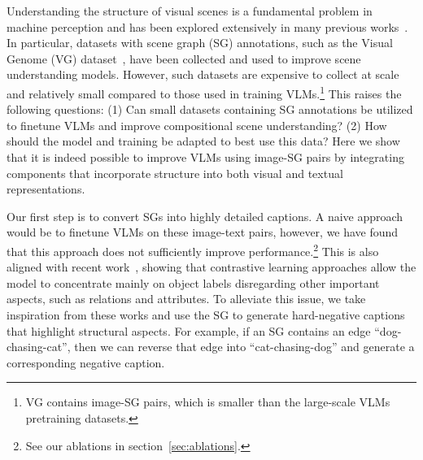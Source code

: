 \documentclass[11pt]{article}
\def\secref#1{section~\ref{#1}}
\begin{document}
Understanding the structure of visual scenes is a fundamental problem in machine perception and has been explored extensively in many previous works~\cite{sg_generation_msg_pass,herzig2019canonical,Yang2022PanopticSG}. In particular, datasets with scene graph (SG) annotations, such as the Visual Genome (VG) dataset~\cite{krishna2017visual}, have been collected and used to improve scene understanding models. However, such datasets are expensive to collect at scale and relatively small compared to those used in training VLMs.\footnote{VG contains  image-SG pairs, which is  smaller than the large-scale VLMs pretraining datasets.} This raises the following questions: (1) Can small datasets containing SG annotations be utilized to finetune VLMs and improve compositional scene understanding? (2) How should the model and training be adapted to best use this data? Here we show that it is indeed possible to improve VLMs using image-SG pairs by integrating components that incorporate structure into both visual and textual representations.

























Our first step is to convert SGs into highly detailed captions. A naive approach would be to finetune VLMs on these image-text pairs, however, we have found that this approach does not sufficiently improve performance.\footnote{See our ablations in \secref{sec:ablations}.} This is also aligned with recent work~\cite{doveh2022teaching,yuksekgonul2023when}, showing that contrastive learning approaches allow the model to concentrate mainly on object labels disregarding other important aspects, such as relations and attributes. To alleviate this issue, we take inspiration from these works and use the SG to generate hard-negative captions that highlight structural aspects. For example, if an SG contains an edge ``dog-chasing-cat'', then we can reverse that edge into ``cat-chasing-dog'' and generate a corresponding negative caption. 
\end{document}
